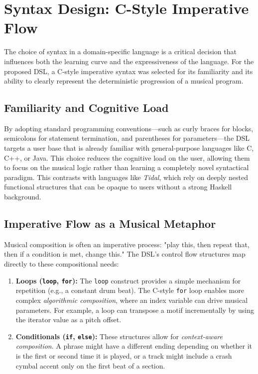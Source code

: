 \section{Syntax Design: C-Style Imperative Flow}\label{sec:syntax-design}

The choice of syntax in a domain-specific language is a critical decision that influences both the learning
curve and the expressiveness of the language.
For the proposed DSL, a C-style imperative syntax was selected for its familiarity and its ability to clearly
represent the deterministic progression of a musical program.

\subsection{Familiarity and Cognitive Load}

By adopting standard programming conventions—such as curly braces for blocks, semicolons for statement
termination, and parentheses for parameters—the DSL targets a user base that is already familiar with
general-purpose languages like C, C++, or Java.
This choice reduces the cognitive load on the user, allowing them to focus on the musical logic rather than
learning a completely novel syntactical paradigm.
This contrasts with languages like \textit{Tidal}, which rely on deeply nested functional structures that can
be opaque to users without a strong Haskell background.

\subsection{Imperative Flow as a Musical Metaphor}

Musical composition is often an imperative process: "play this, then repeat that, then if a condition is met,
change this."
The DSL's control flow structures map directly to these compositional needs:

\begin{enumerate}
  \item \textbf{Loops (\texttt{loop}, \texttt{for}):} The \texttt{loop} construct provides a simple mechanism
    for repetition (e.g., a constant drum beat). The C-style \texttt{for} loop enables more complex
    \textit{algorithmic composition}, where an index variable can drive musical parameters. For example, a
    loop can transpose a motif incrementally by using the iterator value as a pitch offset.
  \item \textbf{Conditionals (\texttt{if}, \texttt{else}):} These structures allow for \textit{context-aware
    composition}. A phrase might have a different ending depending on whether it is the first or second time
    it is played, or a track might include a crash cymbal accent only on the first beat of a section.
\end{enumerate}

